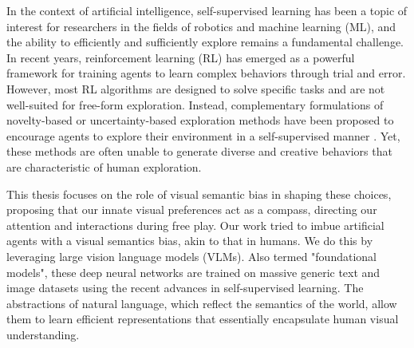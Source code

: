 
In the context of artificial intelligence, self-supervised learning has been a topic of interest for researchers in the fields of robotics and machine learning (ML), and the ability to efficiently and sufficiently explore remains a fundamental challenge.
In recent years, reinforcement learning (RL) has emerged as a powerful framework for training agents to learn complex behaviors through trial and error.
However, most RL algorithms are designed to solve specific tasks and are not well-suited for free-form exploration.
Instead, complementary formulations of novelty-based or uncertainty-based exploration methods have been proposed to encourage agents to explore their environment in a self-supervised manner \citep{rnd,icm,disagreement,exploration_survey}. 
Yet, these methods are often unable to generate diverse and creative behaviors that are characteristic of human exploration.



This thesis focuses on the role of visual semantic bias in shaping these choices, proposing that our innate visual preferences act as a compass, directing our attention and interactions during free play.
Our work tried to imbue artificial agents with a visual semantics bias, akin to that in humans.
We do this by leveraging large vision language models (VLMs).
Also termed "foundational models", these deep neural networks are trained on massive generic text and image datasets using the recent advances in self-supervised learning. 
The abstractions of natural language, which reflect the semantics of the world, allow them to learn efficient representations that essentially encapsulate human visual understanding.

